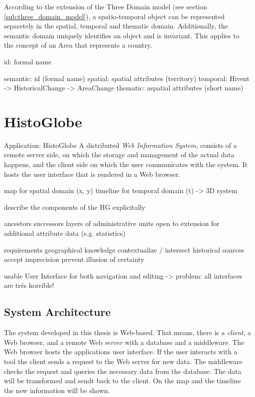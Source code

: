 According to the extension of the Three Domain model (see section \ref{sub:three_domain_model}), a spatio-temporal object can be represented separetely in the spatial, temporal and thematic domain. Additionally, the semantic domain uniquely identifies an object and is invariant. This applies to the concept of an Area that represents a country.


id: formal name

semantic: id (formal name)
spatial:  spatial attributes (territory)
temporal: Hivent -> HistoricalChange -> AreaChange
thematic: aspatial attributes (short name)


\section{HistoGlobe} %
\label{sec:histoglobe}

Application: HistoGlobe
A distributed \emph{Web Information System}, consists of a remote server side, on which the storage and management of the actual data happens, and the client side on which the user communicates with the system. It hosts the user interface that is rendered in a Web browser.

map for spatial domain (x, y)
timeline for temporal domain (t)
-> 3D system

describe the components of the HG explicitally

ancestors successors
layers of administrative units
open to extension for additional attribute data (e.g. statistics)

requirements
  geographical knowledge
  contextualize / intersect historical sources
  accept imprecision
  prevent illusion of certainty

usable User Interface for both navigation and editing
-> problem: all interfaces are trés horrible!



\subsection{System Architecture} %
\label{sub:system_architecture}

The system developed in this thesis is Web-based. That means, there is a \emph{client}, a Web browser, and a remote Web \emph{server} with a database and a middleware. The Web browser hosts the applications user interface. If the user interacts with a tool the client sends a request to the Web server for new data. The middleware checks the request and queries the necessary data from the database. The data will be transformed and sendt back to the client. On the map and the timeline the new information will be shown.


